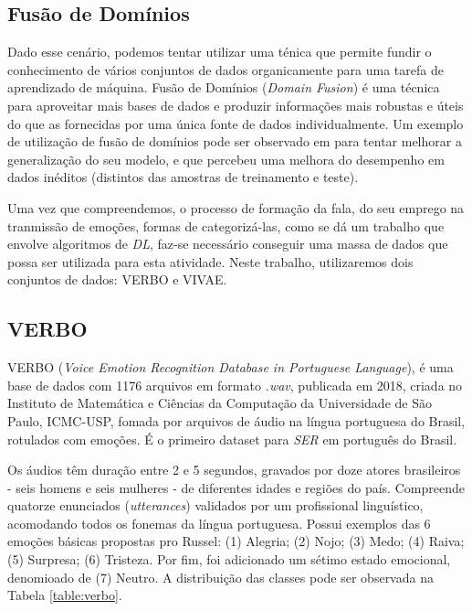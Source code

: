 \subsection{Fusão de Domínios}

Dado esse cenário, podemos tentar utilizar uma ténica que permite fundir o conhecimento de vários conjuntos de dados organicamente para uma tarefa de aprendizado de máquina. Fusão de Domínios \cite{49}(\textit{Domain Fusion}) é uma técnica para aproveitar mais bases de dados e produzir informações mais robustas e úteis do que as fornecidas por uma única fonte de dados individualmente. Um exemplo de utilização de fusão de domínios pode ser observado em \cite{3} para tentar melhorar a generalização do seu modelo, e que percebeu uma melhora do desempenho em dados inéditos (distintos das amostras de treinamento e teste).

Uma vez que compreendemos, o processo de formação da fala, do seu emprego na tranmissão de emoções, formas de categorizá-las, como se dá um trabalho que envolve algoritmos de \textit{DL}, faz-se necessário conseguir uma massa de dados que possa ser utilizada para esta atividade. Neste trabalho, utilizaremos dois conjuntos de dados: VERBO e VIVAE.

\subsection{VERBO}

VERBO \cite{12.21} (\textit{Voice Emotion Recognition Database in Portuguese Language}),  é uma base de dados com 1176 arquivos em formato \textit{.wav}, publicada em 2018, criada no Instituto de Matemática e Ciências da Computação da Universidade de São Paulo, ICMC-USP, fomada por arquivos de áudio na língua portuguesa do Brasil, rotulados com emoções. É o primeiro \cite{21} dataset para \textit{SER} em português do Brasil.

Os áudios têm duração entre 2 e 5 segundos, gravados por doze atores brasileiros - seis homens e seis mulheres - de diferentes idades e regiões do país. Compreende quatorze enunciados (\textit{utterances}) validados por um profissional linguístico, acomodando todos os fonemas da língua portuguesa. Possui exemplos das 6 emoções básicas propostas pro Russel: (1) Alegria; (2) Nojo; (3) Medo; (4) Raiva; (5) Surpresa; (6) Tristeza. Por fim, foi adicionado um sétimo estado emocional, denomioado de (7) Neutro. A distribuição das classes pode ser observada na Tabela \ref{table:verbo}.

